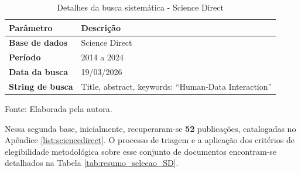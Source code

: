 \documentclass[
	12pt,				%
	oneside,			%
	a4paper,			%
	english,			%
	brazil				%
	]{abntex2ppgsi}
\begin{document}
\begin{table}[htbp]
\centering
\caption{Detalhes da busca sistemática - Science Direct}
\label{tab:detalhes_busca_sd}
\renewcommand{\arraystretch}{1.4} 
\begin{tabular}{@{} >{\bfseries}p{3.5cm} p{11cm} @{}}
\toprule
Parâmetro & Descrição \\
\midrule
Base de dados & Science Direct \\
Período & 2014 a 2024 \\
Data da busca & 19/03/2026 \\
String de busca & Title, abstract, keywords: ``Human-Data Interaction'' \\
\bottomrule
\end{tabular}

\vspace{0.2cm} 
{\small Fonte: Elaborada pela autora.}
\end{table}

    Nessa segunda base, inicialmente, recuperaram-se \textbf{52} publicações, catalogadas no Apêndice \ref{list:sciencedirect}. O processo de triagem e a aplicação dos critérios de elegibilidade metodológica sobre esse conjunto de documentos encontram-se detalhados na Tabela \ref{tab:resumo_selecao_SD}.
\end{document}

